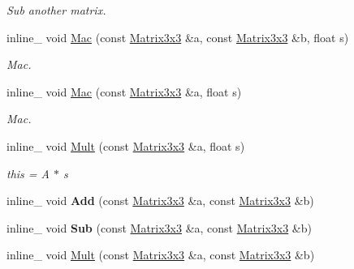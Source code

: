 \begin{DoxyCompactItemize}
\begin{DoxyCompactList}\small\item\em Sub another matrix. \end{DoxyCompactList}\item 
\hypertarget{class_matrix3x3_a98b8f18c1f5a16242a5149889c5f6202}{inline\+\_\+ void \hyperlink{class_matrix3x3_a98b8f18c1f5a16242a5149889c5f6202}{Mac} (const \hyperlink{class_matrix3x3}{Matrix3x3} \&a, const \hyperlink{class_matrix3x3}{Matrix3x3} \&b, float s)}\label{class_matrix3x3_a98b8f18c1f5a16242a5149889c5f6202}

\begin{DoxyCompactList}\small\item\em Mac. \end{DoxyCompactList}\item 
\hypertarget{class_matrix3x3_a3447245ea3ef24f98a8fe9335d002190}{inline\+\_\+ void \hyperlink{class_matrix3x3_a3447245ea3ef24f98a8fe9335d002190}{Mac} (const \hyperlink{class_matrix3x3}{Matrix3x3} \&a, float s)}\label{class_matrix3x3_a3447245ea3ef24f98a8fe9335d002190}

\begin{DoxyCompactList}\small\item\em Mac. \end{DoxyCompactList}\item 
\hypertarget{class_matrix3x3_aedd287d4f7c2ed61c80ac71460ab3c22}{inline\+\_\+ void \hyperlink{class_matrix3x3_aedd287d4f7c2ed61c80ac71460ab3c22}{Mult} (const \hyperlink{class_matrix3x3}{Matrix3x3} \&a, float s)}\label{class_matrix3x3_aedd287d4f7c2ed61c80ac71460ab3c22}

\begin{DoxyCompactList}\small\item\em this = A $\ast$ s \end{DoxyCompactList}\item 
\hypertarget{class_matrix3x3_a9dcba2e1c5f0cab8477fc69b53db2155}{inline\+\_\+ void {\bfseries Add} (const \hyperlink{class_matrix3x3}{Matrix3x3} \&a, const \hyperlink{class_matrix3x3}{Matrix3x3} \&b)}\label{class_matrix3x3_a9dcba2e1c5f0cab8477fc69b53db2155}

\item 
\hypertarget{class_matrix3x3_a3bf4ff7a30a77a02fe8f78076541e3f0}{inline\+\_\+ void {\bfseries Sub} (const \hyperlink{class_matrix3x3}{Matrix3x3} \&a, const \hyperlink{class_matrix3x3}{Matrix3x3} \&b)}\label{class_matrix3x3_a3bf4ff7a30a77a02fe8f78076541e3f0}

\item 
\hypertarget{class_matrix3x3_ac80995881ea1e23f8eb0f6f57bbb624a}{inline\+\_\+ void \hyperlink{class_matrix3x3_ac80995881ea1e23f8eb0f6f57bbb624a}{Mult} (const \hyperlink{class_matrix3x3}{Matrix3x3} \&a, const \hyperlink{class_matrix3x3}{Matrix3x3} \&b)}\label{class_matrix3x3_ac80995881ea1e23f8eb0f6f57bbb624a}


\end{DoxyCompactItemize}
